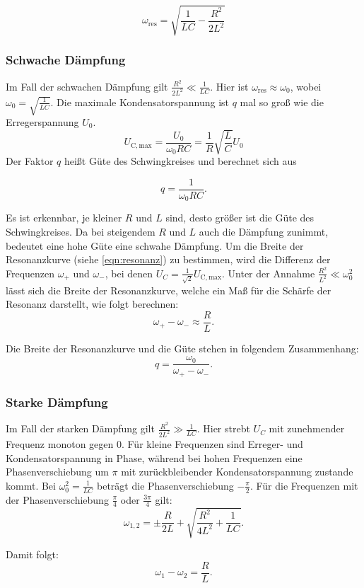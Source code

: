 \begin{equation}
  \omega_\mathrm{res} = \sqrt{\frac{1}{LC} - \frac{R^2}{2L^2}}
\end{equation}

\subsubsection*{Schwache Dämpfung}
Im Fall der schwachen Dämpfung gilt $\frac{R^2}{2L^2} \ll \frac{1}{LC}$. Hier ist $\omega_\mathrm{res} \approx \omega_0$, wobei $\omega_0 = \sqrt{\frac{1}{LC}}$.
Die maximale Kondensatorspannung ist $q$ mal so groß wie die Erregerspannung $U_0$.
\begin{equation}
  U_\mathrm{C, max} = \frac{U_0}{\omega_0 RC} = \frac{1}{R}\sqrt{\frac{L}{C}}U_0
\end{equation}
 Der Faktor $q$ heißt Güte des Schwingkreises und berechnet sich aus

\begin{equation}
q = \frac{1}{\omega_0 RC}.
\end{equation}

Es ist erkennbar, je kleiner $R$ und $L$ sind, desto größer ist die Güte des Schwingkreises. Da bei steigendem $R$ und $L$ auch die Dämpfung zunimmt, bedeutet eine hohe Güte eine schwahe Dämpfung.
Um die Breite der Resonanzkurve (siehe \ref{eqn:resonanz}) zu bestimmen, wird die Differenz der Frequenzen $\omega_+$ und $\omega_-$, bei denen $U_C = \frac{1}{\sqrt{2}} U_\mathrm{C, max}$.
Unter der Annahme $\frac{R^2}{L^2} \ll \omega_0^2$ lässt sich die Breite der Resonanzkurve, welche ein Maß für die Schärfe der Resonanz darstellt, wie folgt berechnen:
\begin{equation}
  \omega_+ - \omega_- \approx \frac{R}{L}.
\end{equation}

Die Breite der Resonanzkurve und die Güte stehen in folgendem Zusammenhang:
\begin{equation}
  q = \frac{\omega_0}{\omega_+ - \omega_-}.
\end{equation}

\subsubsection*{Starke Dämpfung}
Im Fall der starken Dämpfung gilt $\frac{R^2}{2L^2} \gg \frac{1}{LC}$. Hier strebt $U_C$ mit zunehmender Frequenz monoton gegen 0.
Für kleine Frequenzen sind Erreger- und Kondensatorspannung in Phase, während bei hohen Frequenzen eine Phasenverschiebung um $\pi$ mit zurückbleibender Kondensatorspannung zustande kommt. Bei $\omega_0^2 = \frac{1}{LC}$ beträgt die Phasenverschiebung $-\frac{\pi}{2}$.
Für die Frequenzen mit der Phasenverschiebung $\frac{\pi}{4}$ oder $\frac{3\pi}{4}$ gilt:
\begin{equation}
  \omega_\mathrm{1,2} = \pm \frac{R}{2L} + \sqrt{\frac{R^2}{4L^2} + \frac{1}{LC}}.
\end{equation}

Damit folgt:
\begin{equation}
  \omega_{1} - \omega_{2} = \frac{R}{L}.
\end{equation}
